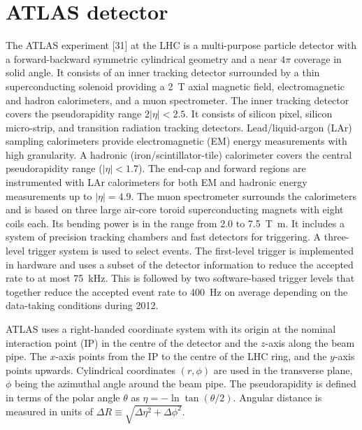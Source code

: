 \section{ATLAS detector}
\label{sec:atlas}

The ATLAS experiment [31] at the LHC is a multi-purpose particle detector
with a forward-backward symmetric cylindrical geometry and a near $4\pi$ coverage in solid angle.
It consists
of an inner tracking detector surrounded by a thin superconducting solenoid
providing a \SI{2}{\tesla} axial magnetic field, electromagnetic and hadron calorimeters, and a muon spectrometer.
The inner tracking detector covers the pseudorapidity range $2 |\eta| < 2.5$.
It consists of
silicon pixel, silicon micro-strip, and transition radiation tracking detectors.
Lead/liquid-argon (LAr) sampling calorimeters provide electromagnetic (EM) energy measurements
with high granularity.
A hadronic (iron/scintillator-tile) calorimeter covers the central
pseudorapidity range ($|\eta| < 1.7$).
The end-cap and forward regions are instrumented with
LAr calorimeters
for both EM and hadronic energy measurements up to $|\eta| = 4.9$.
The
muon spectrometer surrounds the calorimeters and is based on
three large air-core toroid
superconducting magnets with eight coils each.
Its bending power is in the range from
\num{2.0} to \SI{7.5}{\tesla\metre}.
It includes a system of precision tracking chambers and fast detectors for
triggering.
A three-level trigger system is used to select events.
The first-level trigger
is implemented in hardware and uses a subset of the detector information
to reduce the
accepted rate to at most \SI{75}{\kilo\hertz}.
This is followed by two software-based trigger levels
that
together reduce the accepted event rate to \SI{400}{\hertz} on average
depending on the data-taking
conditions during 2012.

ATLAS uses a right-handed coordinate system with its origin at the nominal interaction point (IP)
in the centre of the detector and the $z$-axis along the beam pipe.
The $x$-axis points from the IP to the centre of the LHC ring,
and the $y$-axis points upwards.
Cylindrical coordinates $(r,\phi)$ are used in the transverse plane, 
$\phi$ being the azimuthal angle around the beam pipe.
The pseudorapidity is defined in terms of the polar angle $\theta$ as $\eta = − \ln \tan(\theta/2)$.
Angular distance is measured in units of $\Delta R ≡ \sqrt{\Delta\eta^{2} + \Delta\phi^{2}}$.